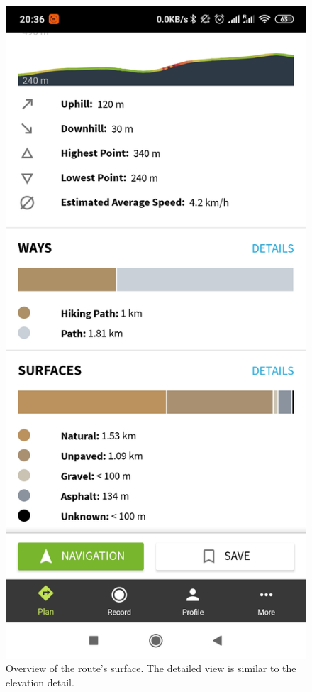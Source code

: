 \begin{figure}[h]
    \includegraphics[width=\textwidth]{Images/komoot-route-surface-detail.jpg}
    \caption{Overview of the route's surface. The detailed view is similar to the elevation detail.\cite{komoot-route-surface-overview-img}}
\end{figure}


